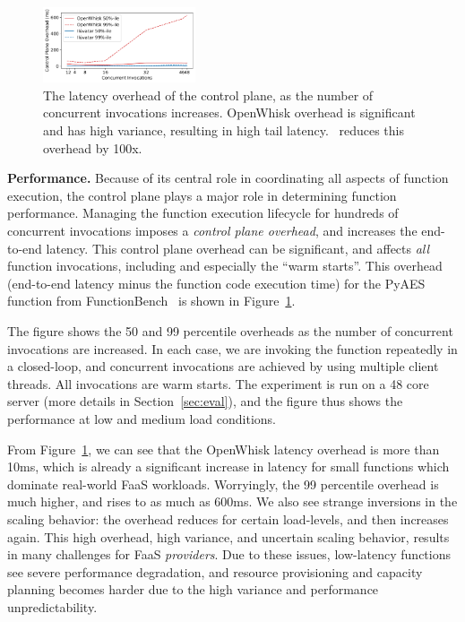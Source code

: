 \begin{figure}
  \centering  \includegraphics[width=0.4\textwidth]{iluvatar/graphs/scaling/pyaes/overhead-scaling.pdf}
  \caption{The latency overhead of the control plane, as the number of concurrent invocations increases. OpenWhisk overhead is significant and has high variance, resulting in high tail latency. \sysname~reduces this overhead by 100x. }
  \label{fig:ow-scaling}
\end{figure}


\noindent \textbf{Performance.}
%
Because of its central role in coordinating all aspects of function execution, the control plane plays a major role in determining function performance. 
Managing the function execution lifecycle for hundreds of concurrent invocations imposes a \emph{control plane overhead}, and increases the end-to-end latency.
This control plane overhead can be significant, and affects \emph{all} function invocations, including and especially the ``warm starts''. 
This overhead (end-to-end latency minus the function code execution time) for the PyAES function from FunctionBench~\cite{kim2019functionbench} is shown in Figure~\ref{fig:ow-scaling}. 

The figure shows the 50 and 99 percentile overheads as the number of concurrent invocations are increased.
In each case, we are invoking the function repeatedly in a closed-loop, and concurrent invocations are achieved by using multiple client threads.
All invocations are warm starts.
The experiment is run on a 48 core server (more details in Section~\ref{sec:eval}), and the figure thus shows the performance at low and medium load conditions. 

From Figure~\ref{fig:ow-scaling}, we can see that the OpenWhisk latency overhead is more than 10ms,  which is already a significant increase in latency for small functions which dominate real-world FaaS workloads.
Worryingly, the 99 percentile overhead is much higher, and rises to as much as 600ms.
We also see strange inversions in the scaling behavior: the overhead reduces for certain load-levels, and then increases again.
This high overhead, high variance, and uncertain scaling behavior, results in many challenges for FaaS \emph{providers}. 
Due to these issues, low-latency functions see severe performance degradation, and resource provisioning and capacity planning becomes harder due to the high variance and performance unpredictability. 
%

